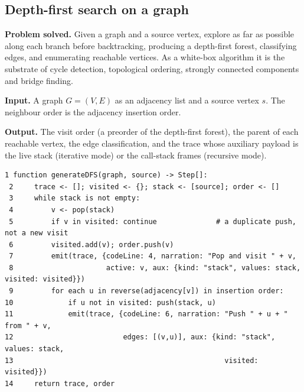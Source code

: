 \documentclass[11pt,a4paper]{article}
\begin{document}
\subsection{Depth-first search on a graph}

\noindent\textbf{Problem solved.} Given a graph and a source vertex, explore as far as possible
along each branch before backtracking, producing a depth-first forest, classifying edges, and
enumerating reachable vertices. As a white-box algorithm it is the substrate of cycle detection,
topological ordering, strongly connected components and bridge finding.

\smallskip
\noindent\textbf{Input.} A graph $G=(V,E)$ as an adjacency list and a source vertex $s$. The
neighbour order is the adjacency insertion order.

\smallskip
\noindent\textbf{Output.} The visit order (a preorder of the depth-first forest), the parent of each
reachable vertex, the edge classification, and the trace whose auxiliary payload is the live stack
(iterative mode) or the call-stack frames (recursive mode).

\begin{lstlisting}[style=pseudo,caption={Instrumented depth-first search, iterative. Neighbours are
pushed in \emph{reverse} adjacency order so that the first neighbour is popped first and the
iterative visit order matches the recursive order exactly.},label={lst:dfsiter}]
 1 function generateDFS(graph, source) -> Step[]:
 2     trace <- []; visited <- {}; stack <- [source]; order <- []
 3     while stack is not empty:
 4         v <- pop(stack)
 5         if v in visited: continue              # a duplicate push, not a new visit
 6         visited.add(v); order.push(v)
 7         emit(trace, {codeLine: 4, narration: "Pop and visit " + v,
 8                      active: v, aux: {kind: "stack", values: stack, visited: visited}})
 9         for each u in reverse(adjacency[v]) in insertion order:
10             if u not in visited: push(stack, u)
11             emit(trace, {codeLine: 6, narration: "Push " + u + " from " + v,
12                          edges: [(v,u)], aux: {kind: "stack", values: stack,
13                                                  visited: visited}})
14     return trace, order
\end{lstlisting}
\end{document}
